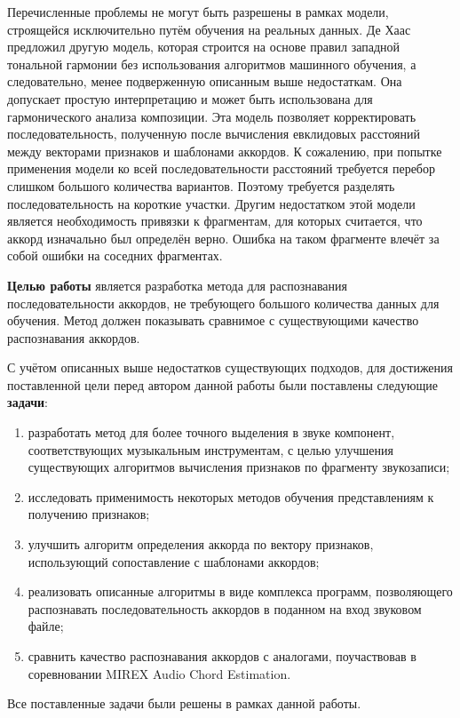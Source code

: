 Перечисленные проблемы не могут быть разрешены в рамках модели, строящейся
исключительно путём обучения на реальных данных. Де Хаас предложил другую
модель, которая строится на основе правил западной тональной гармонии без
использования алгоритмов машинного обучения, а следовательно, менее подверженную
описанным выше недостаткам. Она допускает простую интерпретацию и может быть
использована для гармонического анализа композиции. Эта модель позволяет
корректировать последовательность, полученную после вычисления евклидовых
расстояний между векторами признаков и шаблонами аккордов. К сожалению, при
попытке применения модели ко всей последовательности расстояний требуется
перебор слишком большого количества вариантов. Поэтому требуется разделять
последовательность на короткие участки. Другим недостатком этой модели является
необходимость привязки к фрагментам, для которых считается, что аккорд
изначально был определён верно. Ошибка на таком фрагменте влечёт за собой ошибки
на соседних фрагментах.

\textbf{Целью работы} является разработка метода для распознавания
последовательности аккордов, не требующего большого количества данных для
обучения. Метод должен показывать сравнимое с существующими качество
распознавания аккордов.

С учётом описанных выше недостатков существующих подходов, для достижения
поставленной цели перед автором данной работы были поставлены следующие
\textbf{задачи}:

\begin{enumerate}
  \item разработать метод для более точного выделения в звуке компонент,
  соответствующих музыкальным инструментам, с целью улучшения существующих
  алгоритмов вычисления признаков по фрагменту звукозаписи;
  \item исследовать применимость некоторых методов обучения представлениям к
  получению признаков;
  \item улучшить алгоритм определения аккорда по вектору признаков,
  использующий сопоставление с шаблонами аккордов;
  \item реализовать описанные алгоритмы в виде комплекса программ, позволяющего
  распознавать последовательность аккордов в поданном на вход звуковом файле;
  \item сравнить качество распознавания аккордов с аналогами, поучаствовав в
  соревновании MIREX Audio Chord Estimation.
\end{enumerate}

Все поставленные задачи были решены в рамках данной работы.

